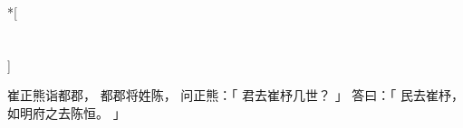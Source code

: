 
\switchcolumn[0]*[\section{}]

崔正熊诣都郡，
都郡将姓陈，
问正熊：「
    君去崔杼几世？
」
答曰：「
    民去崔杼，
    如明府之去陈恒。
」

\switchcolumn



